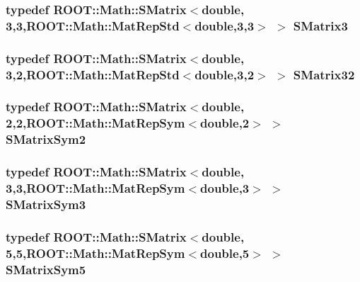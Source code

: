 \subsubsection[{S\-Matrix3}]{\setlength{\rightskip}{0pt plus 5cm}typedef R\-O\-O\-T\-::\-Math\-::\-S\-Matrix$<$double, 3,3,R\-O\-O\-T\-::\-Math\-::\-Mat\-Rep\-Std$<$double,3,3$>$ $>$ {\bf S\-Matrix3}}\label{Driver_8cc_a4c074de1d3d1ffc03c36f9eea63b1888}
\subsubsection[{S\-Matrix32}]{\setlength{\rightskip}{0pt plus 5cm}typedef R\-O\-O\-T\-::\-Math\-::\-S\-Matrix$<$double, 3,2,R\-O\-O\-T\-::\-Math\-::\-Mat\-Rep\-Std$<$double,3,2$>$ $>$ {\bf S\-Matrix32}}\label{Driver_8cc_ac072a901e12523f5b9012ad009f30875}
\subsubsection[{S\-Matrix\-Sym2}]{\setlength{\rightskip}{0pt plus 5cm}typedef R\-O\-O\-T\-::\-Math\-::\-S\-Matrix$<$double, 2,2,R\-O\-O\-T\-::\-Math\-::\-Mat\-Rep\-Sym$<$double,2$>$ $>$ {\bf S\-Matrix\-Sym2}}\label{Driver_8cc_a47f453899a4cc9c991e80599de3e4eb9}
\subsubsection[{S\-Matrix\-Sym3}]{\setlength{\rightskip}{0pt plus 5cm}typedef R\-O\-O\-T\-::\-Math\-::\-S\-Matrix$<$double, 3,3,R\-O\-O\-T\-::\-Math\-::\-Mat\-Rep\-Sym$<$double,3$>$ $>$ {\bf S\-Matrix\-Sym3}}\label{Driver_8cc_a4dd68b11189b8986560a75010c66d92d}
\subsubsection[{S\-Matrix\-Sym5}]{\setlength{\rightskip}{0pt plus 5cm}typedef R\-O\-O\-T\-::\-Math\-::\-S\-Matrix$<$double, 5,5,R\-O\-O\-T\-::\-Math\-::\-Mat\-Rep\-Sym$<$double,5$>$ $>$ {\bf S\-Matrix\-Sym5}}\label{Driver_8cc_ad4e885cf8223404f17d53a9824ae5677}
